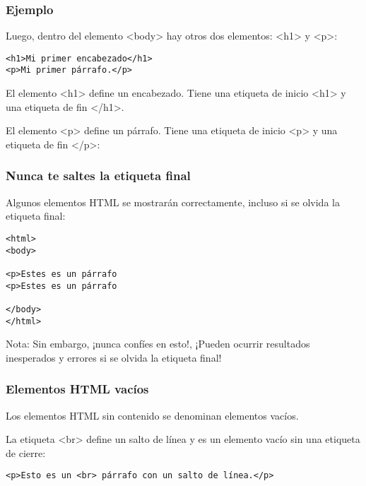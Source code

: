 \begin{frame}[fragile]
  \frametitle{Ejemplo}

  Luego, dentro del elemento <body> hay otros dos elementos: <h1> y <p>:

  \vspace{\baselineskip}
  \begin{lstlisting}
<h1>Mi primer encabezado</h1>
<p>Mi primer párrafo.</p>
  \end{lstlisting}

  \vspace{\baselineskip}
  El elemento <h1> define un encabezado.
  Tiene una etiqueta de inicio <h1> y una etiqueta de fin </h1>.

  \vspace{\baselineskip}
  El elemento <p> define un párrafo.
  Tiene una etiqueta de inicio <p> y una etiqueta de fin </p>:

\end{frame}

\begin{frame}[fragile]
  \frametitle{Nunca te saltes la etiqueta final}

  Algunos elementos HTML se mostrarán correctamente,
  incluso si se olvida la etiqueta final:

  \vspace{\baselineskip}
  \begin{lstlisting}
<html>
<body>

<p>Estes es un párrafo
<p>Estes es un párrafo

</body>
</html>
  \end{lstlisting}

  \begin{alertblock}{Nota:}
    Sin embargo, ¡nunca confíes en esto!,
    ¡Pueden ocurrir resultados inesperados y errores si
    se olvida la etiqueta final!
  \end{alertblock}
\end{frame}

\begin{frame}[fragile]
  \frametitle{Elementos HTML vacíos}

  Los elementos HTML sin contenido se denominan elementos vacíos.

  La etiqueta <br> define un salto de línea y es un elemento vacío
  sin una etiqueta de cierre:

  \vspace{\baselineskip}
  \begin{lstlisting}
<p>Esto es un <br> párrafo con un salto de línea.</p>
  \end{lstlisting}
\end{frame}

